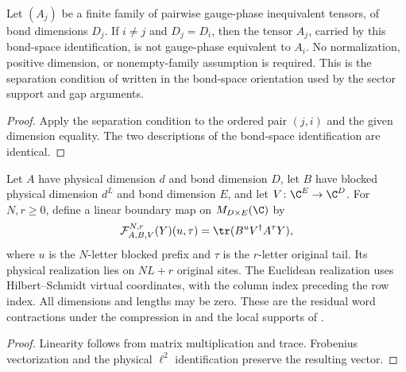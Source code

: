 \begin{lemma}
    \label{thm:sector_separation_bond_transport}
    \leanok
    Let $(A_j)$ be a finite family of pairwise gauge-phase inequivalent
    tensors, of bond dimensions $D_j$. If $i\neq j$ and $D_j=D_i$, then
    the tensor $A_j$, carried by this bond-space identification, is
    not gauge-phase equivalent to $A_i$. No normalization, positive
    dimension, or nonempty-family assumption is required. This is the
    separation condition of
    \cite[Proposition~2.7]{Cirac2016MPDO_arXiv}
    written in the bond-space orientation used by the sector support
    and gap arguments.
\end{lemma}
\begin{proof}\leanok
    Apply the separation condition to the ordered pair $(j,i)$ and the
    given dimension equality. The two descriptions of the bond-space
    identification are identical.
\end{proof}

\begin{definition}
    \label{def:blocked_residual_boundary_map}
    \leanok
    Let $A$ have physical dimension $d$ and bond dimension $D$, let $B$
    have blocked physical dimension $d^L$ and bond dimension $E$, and let
    $V\colon\C^E\to\C^D$. For $N,r\geq0$, define a linear boundary map
    on $M_{D\times E}(\C)$ by
    \begin{align}
        \mathcal F_{A,B,V}^{N,r}(Y)(u,\tau)
        =\tr(B^u V^\dagger A^\tau Y),
    \end{align}
    where $u$ is the $N$-letter blocked prefix and $\tau$ is the
    $r$-letter original tail. Its physical realization lies on $NL+r$
    original sites. The Euclidean realization uses Hilbert--Schmidt
    virtual coordinates, with the column index preceding the row index.
    All dimensions and lengths may be zero. These are the residual
    word contractions under the compression in
    \cite[Lemma~\texttt{blocking-arbitrary}]{DeLasCuevas2017Irreducible}
    and the local supports of
    \cite[Section~3, lines~1504--1538]{Nachtergaele1996Spectral}.
\end{definition}
\begin{proof}\leanok
    Linearity follows from matrix multiplication and trace. Frobenius
    vectorization and the physical $\ell^2$ identification preserve
    the resulting vector.
\end{proof}

